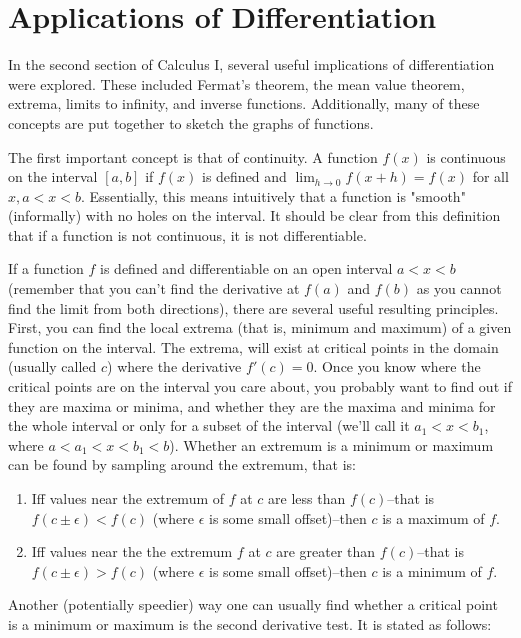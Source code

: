\documentclass[12pt]{amsart}
\begin{document}
\section{Applications of Differentiation}

In the second section of Calculus I, several useful implications of differentiation were explored. These included Fermat's theorem, the mean value theorem, extrema, limits to infinity, and inverse functions. Additionally, many of these concepts are put together to sketch the graphs of functions. 

The first important concept is that of continuity. A function $f(x)$ is continuous on the interval $[a,b]$ if $f(x)$ is defined and $\lim_{h \to 0} f(x+h) = f(x)$ for all $x, a<x<b$. Essentially, this means intuitively that a function is "smooth" (informally) with no holes on the interval. It should be clear from this definition that if a function is not continuous, it is not differentiable.

If a function $f$ is defined and differentiable on an open interval $a < x < b$ (remember that you can't find the derivative at $f(a)$ and $f(b)$ as you cannot find the limit from both directions), there are several useful resulting principles. First, you can find the local extrema (that is, minimum and maximum) of a given function on the interval. The extrema, will exist at critical points in the domain (usually called $c$) where the derivative $f'(c) = 0$. Once you know where the critical points are on the interval you care about, you probably want to find out if they are maxima or minima, and whether they are the maxima and minima for the whole interval or only for a subset of the interval (we'll call it $a_1 < x < b_1$, where $a < a_1 < x < b_1 < b$). Whether an extremum is a minimum or maximum can be found by sampling around the extremum, that is:

\begin{enumerate}
\item Iff values near the extremum of $f$ at $c$ are less than $f(c)$--that is $f(c \pm \epsilon) < f(c)$ (where $\epsilon$ is some small offset)--then $c$ is a maximum of $f$.
\item Iff values near the the extremum $f$ at $c$ are greater than $f(c)$--that is $f(c \pm \epsilon) > f(c)$ (where $\epsilon$ is some small offset)--then $c$ is a minimum of $f$.
\end{enumerate}

Another (potentially speedier) way one can usually find whether a critical point is a minimum or maximum is the second derivative test. It is stated as follows:
\end{document}

